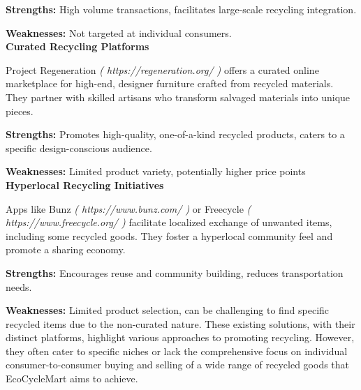 \documentclass[12pt, a4paper, oneside]{article}
\begin{document}
\textbf{Strengths:} High volume transactions, facilitates large-scale recycling integration.

\textbf{Weaknesses:} Not targeted at individual consumers.\\

\textbf{Curated Recycling Platforms}

 Project Regeneration \textit{( https://regeneration.org/ )} offers a curated online marketplace for high-end, designer furniture crafted from recycled materials. They partner with skilled artisans who transform salvaged materials into unique pieces.
 
\textbf{Strengths:} Promotes high-quality, one-of-a-kind recycled products, caters to a specific design-conscious audience.

\textbf{Weaknesses:} Limited product variety, potentially higher price points
\\

\textbf{Hyperlocal Recycling Initiatives}

 Apps like Bunz \textit{( https://www.bunz.com/ )} or Freecycle \textit{( https://www.freecycle.org/ )} facilitate localized exchange of unwanted items, including some recycled goods. They foster a hyperlocal community feel and promote a sharing economy.
 
\textbf{Strengths:} Encourages reuse and community building, reduces transportation needs.

\textbf{Weaknesses:} Limited product selection, can be challenging to find specific recycled items due to the non-curated nature. 
These existing solutions, with their distinct platforms, highlight various approaches to promoting recycling. However, they often cater to specific niches or lack the comprehensive focus on individual consumer-to-consumer buying and selling of a wide range of recycled goods that EcoCycleMart aims to achieve.

%
\end{document}
